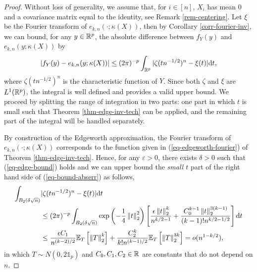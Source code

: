 \begin{proof}
    Without loss of generality, we assume that, for $i \in [n]$, $X_i$ has mean 0 and a covariance matrix equal to the identity, see Remark \ref{rem-centering}. Let $\xi$ be the Fourier transform of $e_{k, n}(\cdot; \kappa(X))$, then by Corollary \ref{corr-fourier-inv}, we can bound, for any $y \in \Rp$, the absolute difference between $f_Y(y)$ and $e_{k, n}(y; \kappa(X))$ by
    \begin{equation} \label{eq-bound-abserr}
        |f_Y(y) - e_{k, n}(y; \kappa(X))| \leq (2\pi)^{-p}\intRp{t}{|\zeta(tn^{-1/2})^n - \xi(t)|},
    \end{equation}
    where $\zeta(tn^{-1/2})^n$ is the characteristic function of $Y$. Since both $\zeta$ and $\xi$ are $L^1(\Rp)$, the integral is well defined and provides a valid upper bound. We proceed by splitting the range of integration in two parts: one part in which $t$ is small such that Theorem \ref{thm-edge-inv-tech} can be applied, and the remaining part of the integral will be handled separately.

    By construction of the Edgeworth approximation, the Fourier transform of $e_{k, n}(\cdot; \kappa(X))$ corresponds to the function given in (\ref{eq-edgeworth-fourier}) of Theorem \ref{thm-edge-inv-tech}. Hence, for any $\varepsilon > 0$, there exists $\delta > 0$ such that (\ref{eq-edge-bound}) holds and we can upper bound the \textit{small $t$} part of the right hand side of (\ref{eq-bound-abserr}) as follows,
    \begin{align*}
        \int_{B_2(\delta\sqrt{n})} &|\zeta(tn^{-1/2})^n - \xi(t)| \d t\\
        &\leq (2\pi)^{-p}\int_{B_2(\delta\sqrt{n})}\expf{-\frac{1}{4}\norm{t}_2^2}\left[ \frac{\epsilon\norm{t}_2^{k}}{n^{k/2-1}} + \frac{C_0^{k-1}\norm{t}_2^{3(k-1)}}{(k-1)!n^{k/2-1/2}} \right] \d t \\
        &\leq \frac{\epsilon C_1}{n^{(k-2)/2}}\expec{T}{\norm{T}^k_2} + \frac{C_2^{k}}{k!n^{(k-1)/2}}\expec{T}{\norm{T}_2^{3k}}
        = o(n^{1-k/2}),
    \end{align*}
    in which $T \sim N(0, 2\mathbb{1}_p)$ and $C_0, C_1, C_2 \in \R$ are constants that do not depend on $n$. 


\end{proof}
